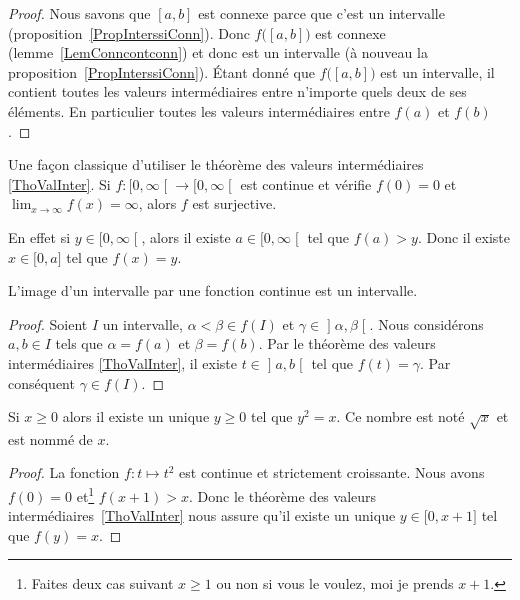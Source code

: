 \begin{proof}
Nous savons que $[a,b]$ est connexe parce que c'est un intervalle (proposition~\ref{PropInterssiConn}). Donc $f\big( [a,b] \big)$ est connexe (lemme~\ref{LemConncontconn}) et donc est un intervalle (à nouveau la proposition~\ref{PropInterssiConn}). Étant donné que $f\big( [a,b] \big)$ est un intervalle, il contient toutes les valeurs intermédiaires entre n'importe quels deux de ses éléments. En particulier toutes les valeurs intermédiaires entre $f(a)$ et $f(b)$.
\end{proof}

\begin{normaltext}      \label{NORMooTQWWooQVPWIJ}
    Une façon classique d'utiliser le théorème des valeurs intermédiaires \ref{ThoValInter}. Si \( f\colon \mathopen[ 0 , \infty \mathclose[\to \mathopen[ 0 , \infty \mathclose[\) est continue et vérifie \( f(0)=0\) et \( \lim_{x\to \infty} f(x)=\infty\), alors \( f\) est surjective.

        En effet si \( y\in \mathopen[ 0 , \infty \mathclose[\), alors il existe \( a\in\mathopen[ 0 , \infty \mathclose[\) tel que \( f(a)>y\). Donc il existe \( x\in \mathopen[ 0 , a \mathclose]\) tel que \( f(x)=y\).
\end{normaltext}

\begin{corollary}       \label{CorImInterInter}
L'image d'un intervalle par une fonction continue est un intervalle.
\end{corollary}

\begin{proof}
Soient \( I\) un intervalle, \( \alpha<\beta\in f(I)\) et \( \gamma\in\mathopen] \alpha , \beta \mathclose[\). Nous considérons \(a,b\in I\) tels que \( \alpha=f(a)\) et \( \beta=f(b)\). Par le théorème des valeurs intermédiaires \ref{ThoValInter}, il existe \( t\in\mathopen] a , b \mathclose[\) tel que \( f(t)=\gamma\). Par conséquent \( \gamma\in f(I)\).
\end{proof}

\begin{corollaryDef}     \label{DEFooGQTYooORuvQb}
    Si \( x\geq 0\) alors il existe un unique \( y\geq 0\) tel que \( y^2=x\). Ce nombre est noté \( \sqrt{x}\) et est nommé  de \( x\).
\end{corollaryDef}

\begin{proof}
    La fonction \( f\colon t\mapsto t^2\) est continue et strictement croissante. Nous avons \( f(0)=0\) et\footnote{Faites deux cas suivant \( x\geq 1\) ou non si vous le voulez, moi je prends \( x+1\).} \( f(x+1)>x\). Donc le théorème des valeurs intermédiaires~\ref{ThoValInter} nous assure qu'il existe un unique \( y\in\mathopen[ 0 , x+1 \mathclose]\) tel que \( f(y)=x\).
\end{proof}

